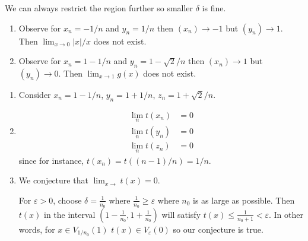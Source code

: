 We can always restrict the region further so smaller $\delta$ is fine.

\begin{enumerate}[label=(\alph*)]
    \item
    Observe for $x_n=-1/n$ and $y_n=1/n$ then $(x_n)\rightarrow -1$
    but $(y_n)\rightarrow 1$. Then $\lim_{x\rightarrow 0} |x|/x$ 
    does not exist.

    \item 
    Observe for $x_n=1-1/n$ and $y_n=1-\sqrt{2}/n$ then $(x_n)\rightarrow 1$
    but $(y_n)\rightarrow 0$. Then $\lim_{x\rightarrow 1} g(x)$ 
    does not exist.
\end{enumerate}

\begin{enumerate}[label=(\alph*)]
    \item 
    Consider $x_n=1-1/n$, $y_n=1+1/n$, $z_n=1+\sqrt{2}/n$.

    \item
    \begin{align*}
        \lim_{n} t(x_n) &=  0\\
        \lim_{n} t(y_n) &= 0\\
        \lim_{n} t(z_n) &= 0
    \end{align*}
    since for instance, $t(x_n)=t((n-1)/n)=1/n$.

    \item
    We conjecture that $\lim_{x \rightarrow} t(x) = 0$.
    
    For $\varepsilon>0$, choose $\delta = \frac{1}{n_0}$ where
    $\frac{1}{n_0} \geq \varepsilon$ where $n_0$ is as large as possible.
    Then $t(x)$ in the interval $(1-\frac{1}{n_0}, 1+\frac{1}{n_0})$
    will satisfy $t(x)\leq \frac{1}{n_0+1} < \varepsilon$.
    In other words, for $x\in V_{1/n_0}(1)$ $t(x)\in V_\varepsilon(0)$
    so our conjecture is true.
\end{enumerate}

